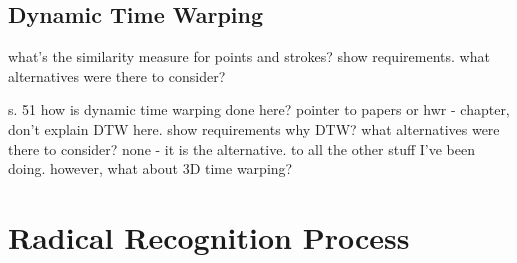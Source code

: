 \subsection{Dynamic Time Warping}
\label{sec:hwre:dynamictimewarping}

what's the similarity measure for
points and strokes?
show requirements.
what alternatives were there to consider?

s. 51
how is dynamic time warping done here?
pointer to papers or hwr - chapter, don't explain DTW here.
show requirements
why DTW?
what alternatives were there to consider?
none - it is the alternative.
to all the other stuff I've been doing.
however, what about 3D time warping?


\section{Radical Recognition Process}
\label{sec:hwre:radicalrecognitionprocess}






    
